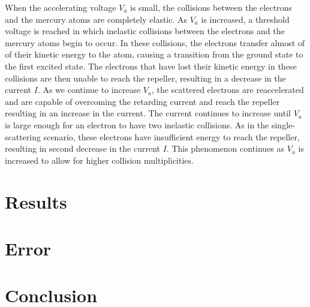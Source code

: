\documentclass[aps, reprint,amsmath,amssymb]{revtex4-1} %
\begin{document}
When the accelerating voltage $V_a$ is small, the collisions between the electrons and the mercury atoms are completely elastic. As $V_a$ is increased, a threshold voltage is reached in which inelastic collisions between the electrons and the mercury atoms begin to occur. In these collisions, the electrons transfer almost of of their kinetic energy to the atom, causing a transition from the ground state to the first excited state. The electrons that have lost their kinetic energy in these collisions are then unable to reach the repeller, resulting in a decrease in the current $I$. As we continue to increase $V_a$, the scattered electrons are reaccelerated and are capable of overcoming the retarding current and reach the repeller resulting in an increase in the current. The current continues to increase until $V_a$ is large enough for an electron to have two inelastic collisions. As in the single-scattering scenario, these electrons have insufficient energy to reach the repeller, resulting in second decrease in the current $I$. This phenomenon continues as $V_a$ is increased to allow for higher collision multiplicities.

\section{Results}


\section{Error}

\section{Conclusion}
\end{document}
